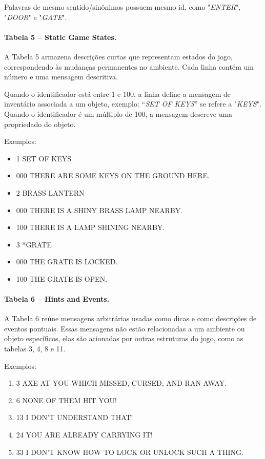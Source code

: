 \documentclass[12pt,a4paper]{article}
\begin{document}
Palavras de mesmo sentido/sinônimos possuem mesmo id, como "\textit{ENTER}", "\textit{DOOR}" e "\textit{GATE}".

\paragraph{Tabela 5 – Static Game States.}  
A Tabela 5 armazena descrições curtas que representam estados do jogo, correspondendo às mudanças permanentes no ambiente. Cada linha contém um número e uma mensagem descritiva.  

Quando o identificador está entre 1 e 100, a linha define a mensagem de inventário associada a um objeto, exemplo: “\textit{SET OF KEYS}” se refere a "\textit{KEYS}". Quando o identificador é um múltiplo de 100, a mensagem descreve uma propriedado do objeto. 

Exemplos:  
\begin{itemize}
    \item 1	SET OF KEYS
    \item 000	THERE ARE SOME KEYS ON THE GROUND HERE.
    \item 2	BRASS LANTERN
    \item 000	THERE IS A SHINY BRASS LAMP NEARBY.
    \item 100	THERE IS A LAMP SHINING NEARBY.
    \item 3	*GRATE
    \item 000	THE GRATE IS LOCKED.
    \item 100	THE GRATE IS OPEN.
\end{itemize}

\paragraph{Tabela 6 – Hints and Events.}
A Tabela 6 reúne mensagens arbitrárias usadas como dicas e como descrições de eventos pontuais. Essas mensagens não estão relacionadas a um ambiente ou objeto específicos, elas são acionadas por outras estruturas do jogo, como as tabelas 3, 4, 8 e 11.

Exemplos:
\begin{enumerate}
    \item 3	AXE AT YOU WHICH MISSED, CURSED, AND RAN AWAY.
    \item 6	NONE OF THEM HIT YOU!
    \item 13 I DON'T UNDERSTAND THAT!
    \item 24 YOU ARE ALREADY CARRYING IT!
    \item 33 I DON'T KNOW HOW TO LOCK OR UNLOCK SUCH A THING.
\end{enumerate}
\end{document}
